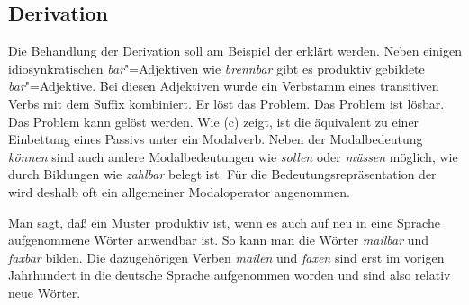 



\subsection{Derivation}
\label{sec-bard}

Die Behandlung der Derivation soll am Beispiel der \bard erklärt werden. Neben einigen idiosynkratischen
\emph{bar}"=Adjektiven wie \zb \emph{brennbar} gibt es produktiv gebildete \emph{bar}"=Adjektive.
Bei diesen Adjektiven wurde ein Verbstamm eines transitiven Verbs mit dem Suffix  kombiniert.
\eal
\ex Er löst das Problem.
\ex Das Problem ist lösbar.
\ex Das Problem kann gelöst werden.
\zl
Wie (c) zeigt, ist die \bard äquivalent zu einer Einbettung eines Passivs unter ein Modalverb. Neben
der Modalbedeutung \emph{können} sind auch andere Modalbedeutungen wie \zb \emph{sollen} oder \emph{müssen}
möglich, wie durch Bildungen wie \emph{zahlbar} belegt ist. Für die Bedeutungsrepräsentation der \bard wird
deshalb oft ein allgemeiner Modaloperator angenommen.

Man sagt, daß ein Muster produktiv ist, wenn es auch auf neu in eine Sprache
aufgenommene Wörter anwendbar ist. So kann man \zb die Wörter \emph{mailbar} und \emph{faxbar}
bilden. Die dazugehörigen Verben \emph{mailen} und \emph{faxen} sind erst im vorigen Jahrhundert in
die deutsche Sprache aufgenommen worden und sind also relativ neue Wörter.

